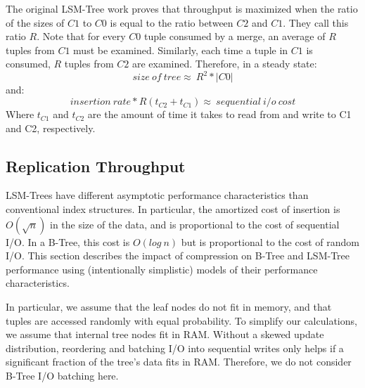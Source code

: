 \documentclass{vldb}
\newcommand{\rows}{Rose\xspace}
\begin{document}
The original LSM-Tree work proves that throughput
is maximized when the ratio of the sizes of $C1$ to $C0$ is equal to
the ratio between $C2$ and $C1$.  They call this ratio $R$.  Note that
for every $C0$ tuple consumed by a
merge, an average of $R$ tuples from $C1$ must be examined.  Similarly, each time a
tuple in $C1$ is consumed, $R$ tuples from $C2$ are examined.
Therefore, in a steady state:
\[size~of~tree\approx~R^2*|C0|\]
and:
\[insertion~rate*R(t_{C2}+t_{C1})\approx~sequential~i/o~cost\]
Where $t_{C1}$ and $t_{C2}$ are the amount of time it takes to read
from and write to C1 and C2, respectively.


\subsection{Replication Throughput}

LSM-Trees have different asymptotic performance characteristics than
conventional index structures.  In particular, the amortized cost of
insertion is $O(\sqrt{n})$ in the size of the data, and is proportional
 to the cost of sequential I/O.  In a B-Tree, this cost is
$O(log~n)$ but is proportional to the cost of random I/O.
This section describes the impact of compression on B-Tree
and LSM-Tree performance using (intentionally simplistic) models of
their performance characteristics.

In particular, we assume that the leaf nodes do not fit in memory, and
that tuples are accessed randomly with equal probability.  To simplify
our calculations, we assume that internal tree nodes fit in RAM.
Without a skewed update distribution, reordering and batching I/O into
sequential writes only helps if a significant fraction of the tree's
data fits in RAM.  Therefore, we do not consider B-Tree I/O batching here.
\end{document}
